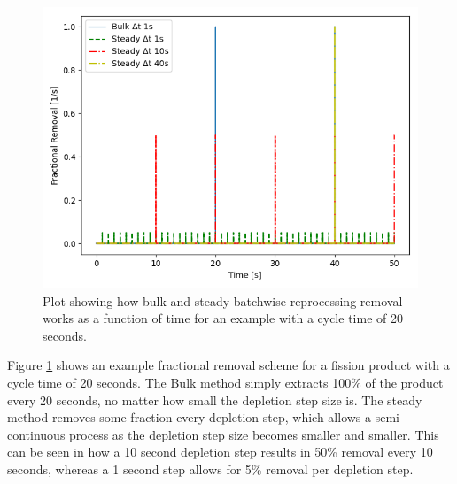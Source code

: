 \begin{figure}[H]
  \centering
  \includegraphics[scale=0.45]{images/bulk-compare-cycles.png}
  \caption{Plot showing how bulk and steady batchwise reprocessing removal works as a function of time for an example with a cycle time of 20 seconds.}
   \label{fig:bulk_repr_cnst}
\end{figure}

Figure \ref{fig:bulk_repr_cnst} shows an example fractional removal scheme for a fission product with a cycle time of 20 seconds. The Bulk method simply extracts 100\% of the product every 20 seconds, no matter how small the depletion step size is. The steady method removes some fraction every depletion step, which allows a semi-continuous process as the depletion step size becomes smaller and smaller. This can be seen in how a 10 second depletion step results in 50\% removal every 10 seconds, whereas a 1 second step allows for 5\% removal per depletion step.



